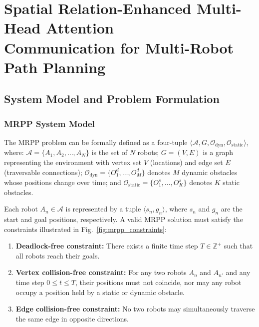 \documentclass[conference]{IEEEtran}
\begin{document}
\section{Spatial Relation-Enhanced Multi-Head Attention\\
Communication for Multi-Robot Path Planning}

\subsection{System Model and Problem Formulation}

\subsubsection{MRPP System Model}

The MRPP problem can be formally defined as a four-tuple
$\langle \mathcal{A}, G, \mathcal{O}_{\mathrm{dyn}},
\mathcal{O}_{\mathrm{static}} \rangle$, where:
$\mathcal{A}=\{A_1, A_2, \ldots, A_N\}$ is the set of $N$ robots;
$G=(V,E)$ is a graph representing the environment with vertex set
$V$ (locations) and edge set $E$ (traversable connections);
$\mathcal{O}_{\mathrm{dyn}}=\{O_1^d, \ldots, O_M^d\}$ denotes $M$
dynamic obstacles whose positions change over time; and
$\mathcal{O}_{\mathrm{static}}=\{O_1^s, \ldots, O_K^s\}$ denotes
$K$ static obstacles.

Each robot $A_n \in \mathcal{A}$ is represented by a tuple
$\langle s_n, g_n \rangle$, where $s_n$ and $g_n$ are the start
and goal positions, respectively.
A valid MRPP solution must satisfy the constraints illustrated
in Fig.~\ref{fig:mrpp_constraints}:

\begin{enumerate}
\item \textbf{Deadlock-free constraint:}
There exists a finite time step $T \in \mathbb{Z}^+$ such that all
robots reach their goals.
\item \textbf{Vertex collision-free constraint:}
For any two robots $A_n$ and $A_{n'}$ and any time step
$0 \le t \le T$, their positions must not coincide, nor may any
robot occupy a position held by a static or dynamic obstacle.
\item \textbf{Edge collision-free constraint:}
No two robots may simultaneously traverse the same edge in
opposite directions.
\end{enumerate}
\end{document}
